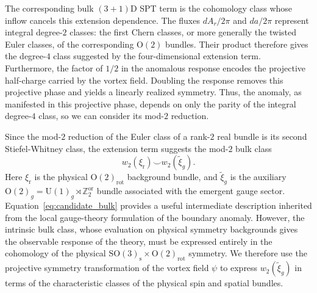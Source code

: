 \documentclass[aps,prx,reprint,superscriptaddress,twocolumn,amsmath,amssymb,amsfonts, nofootinbib]{revtex4-2}
\theoremstyle{apsstyle}
\begin{document}
\bigskip 

The corresponding bulk $(3+1)$D SPT term is the cohomology class whose inflow cancels this extension dependence. The fluxes $dA_r/2\pi$ and $da/2\pi$ represent integral degree-$2$ classes: the first Chern classes, or more generally the twisted Euler classes, of the corresponding $\mathrm{O}(2)$ bundles. Their product therefore gives the degree-$4$ class suggested by the four-dimensional extension term. Furthermore, the factor of $1/2$ in the anomalous response encodes the projective half-charge carried by the vortex field. Doubling the response removes this projective phase and yields a linearly realized symmetry. Thus, the anomaly, as manifested in this projective phase, depends on only the parity of the integral degree-$4$ class, so we can consider its mod-$2$ reduction. 

Since the mod-$2$ reduction of the Euler class of a rank-$2$ real bundle is its second Stiefel-Whitney class, the extension term suggests the mod-$2$ bulk class
\begin{equation}
    w_2(\xi_{\mathrm{r}})\smile w_2(\widetilde{\xi}_g).
    \label{eq:candidate_bulk}
\end{equation}
Here $\xi_{\mathrm{r}}$ is the physical
$\mathrm{O}(2)_{\mathrm{rot}}$ background bundle, and
$\widetilde{\xi}_g$ is the auxiliary
$\mathrm{O}(2)_g=\mathrm{U}(1)_g\rtimes\mathbb Z_2^{\mathrm{or}}$
bundle associated with the emergent gauge sector. Equation~\eqref{eq:candidate_bulk} provides a useful intermediate description inherited from the local gauge-theory formulation of the boundary anomaly. However, the intrinsic bulk class, whose evaluation on physical symmetry backgrounds gives the observable response of the theory, must be expressed entirely in the cohomology of the physical $\mathrm{SO}(3)_{\mathrm{s}}\times\mathrm{O}(2)_{\mathrm{rot}}$ symmetry. We therefore use the projective symmetry transformation of the vortex field $\psi$ to express $w_2(\widetilde{\xi}_g)$ in terms of the characteristic classes of the physical spin and spatial bundles.

 
\end{document}
